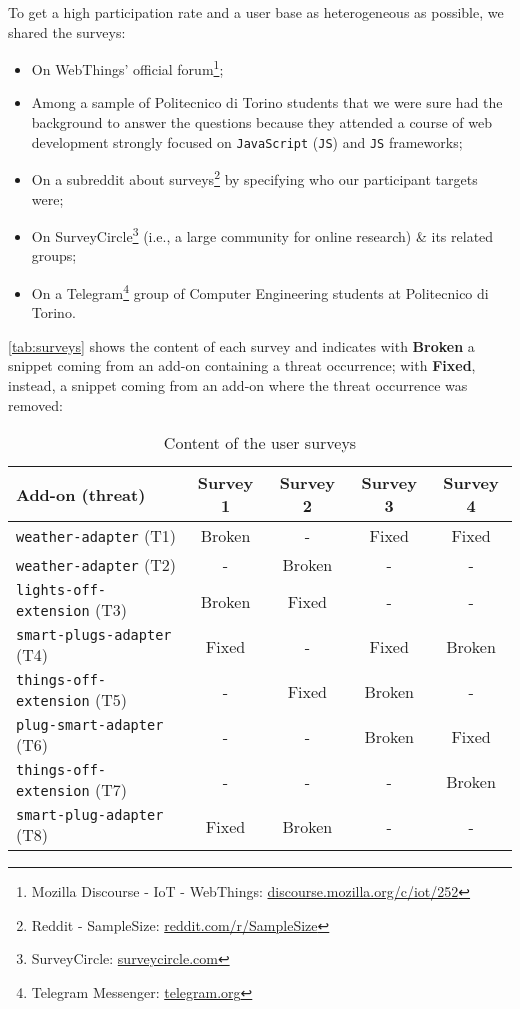 To get a high participation rate and a user base as heterogeneous as possible, we shared the surveys:
\begin{itemize}
    \item On WebThings' official forum\footnote{Mozilla Discourse - IoT - WebThings: \href{https://discourse.mozilla.org/c/iot/252}{discourse.mozilla.org/c/iot/252}};
    
    \item Among a sample of Politecnico di Torino students that we were sure had the background to answer the questions because they attended a course of web development strongly focused on \texttt{JavaScript} (\texttt{JS}) and \texttt{JS} frameworks;

    \item On a subreddit about surveys\footnote{Reddit - SampleSize: \href{https://www.reddit.com/r/SampleSize/}{reddit.com/r/SampleSize}} by specifying who our participant targets were;

    \item On SurveyCircle\footnote{SurveyCircle: \href{https://www.surveycircle.com/en/}{surveycircle.com}} (i.e., a large community for online research) \& its related groups;

    \item On a Telegram\footnote{Telegram Messenger: \href{https://telegram.org}{telegram.org}} group of Computer Engineering students at Politecnico di Torino.
\end{itemize}
\autoref{tab:surveys} shows the content of each survey and indicates with \textbf{Broken} a snippet coming from an add-on containing a threat occurrence; with \textbf{Fixed}, instead, a snippet coming from an add-on where the threat occurrence was removed:

\begin{table}[!h]
    \centering
    \begin{tabular}{| l | c | c | c | c |}
     \hline
     \textbf{Add-on (threat)} & \textbf{Survey 1} & \textbf{Survey 2} & \textbf{Survey 3} & \textbf{Survey 4} \\
     \hline
     \texttt{weather-adapter} (T1) & Broken  &  - & Fixed & Fixed \\
     \hline
     \texttt{weather-adapter} (T2) & -  & Broken & - & - \\
     \hline
     \texttt{lights-off-extension} (T3) & Broken & Fixed & - & - \\
     \hline
     \texttt{smart-plugs-adapter} (T4) & Fixed & - & Fixed & Broken \\
     \hline
     \texttt{things-off-extension} (T5) & - & Fixed & Broken & - \\
     \hline
     \texttt{plug-smart-adapter} (T6) & - & - & Broken & Fixed \\
     \hline
     \texttt{things-off-extension} (T7) & - & - & - & Broken \\
     \hline
     \texttt{smart-plug-adapter} (T8) & Fixed & Broken & - & - \\
    \hline
    \end{tabular}
    \caption{Content of the user surveys}
    \label{tab:surveys}
\end{table}


